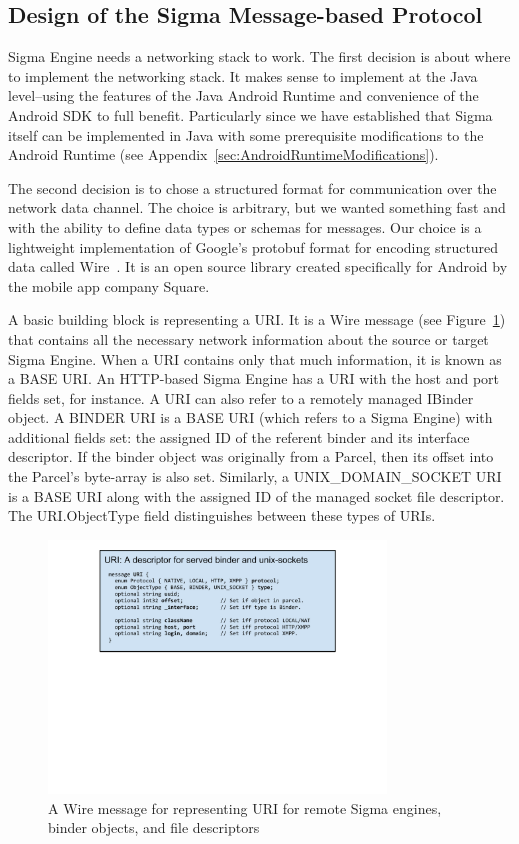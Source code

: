 \documentclass[prodmode]{acmlarge}
\begin{document}
\subsection{Design of the Sigma Message-based Protocol}
Sigma Engine needs a networking stack to work. The first decision is about where to implement the networking stack. It makes sense to implement at the Java level--using the features of the Java Android Runtime and convenience of the Android SDK to full benefit. Particularly since we have established that Sigma itself can be implemented in Java with some prerequisite modifications to the Android Runtime (see Appendix~\ref{sec:AndroidRuntimeModifications}).

The second decision is to chose a structured format for communication over the network data channel. The choice is arbitrary, but we wanted something fast and with the ability to define data types or schemas for messages. Our choice is a lightweight implementation of Google's protobuf format for encoding structured data called Wire~\cite{Wire,IntroWire}. It is an open source library created specifically for Android by the mobile app company Square.

A basic building block is representing a URI. It is a Wire message (see Figure~\ref{fig:WireURI}) that contains all the necessary network information about the source or target Sigma Engine. When a URI contains only that much information, it is known as a BASE URI. An HTTP-based Sigma Engine has a URI with the host and port fields set, for instance. A URI can also refer to a remotely managed IBinder object. A BINDER URI is a BASE URI (which refers to a Sigma Engine) with additional fields set: the assigned ID of the referent binder and its interface descriptor. If the binder object was originally from a Parcel, then its offset into the Parcel's byte-array is also set. Similarly, a UNIX\_DOMAIN\_SOCKET URI is a BASE URI along with the assigned ID of the managed socket file descriptor. The URI.ObjectType field distinguishes between these types of URIs.

\begin{figure}[h!]
\centering
\includegraphics[width=0.8\textwidth]{drawings/WireURI.pdf}
\caption{A Wire message for representing URI for remote Sigma engines, binder objects, and file descriptors}
\label{fig:WireURI}
\end{figure}
\end{document}
